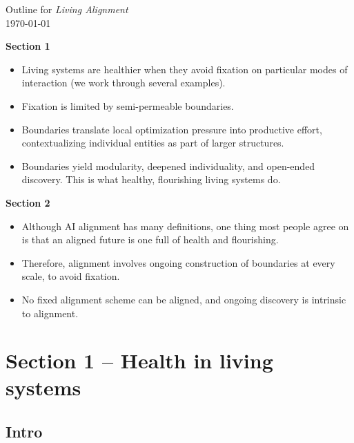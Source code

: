 \documentclass[11pt]{article}
\newcommand{\titleblock}{%
  \begin{center}
    {\LARGE Outline for \textit{Living Alignment}}\\[0.4em]
    {\normalsize\today}
  \end{center}
}
\begin{document}
\vspace{-2.5em}
\titleblock
\vspace{-1em}

\medskip
\begin{previewbox}
\noindent\textbf{Section 1}
\begin{itemize}[leftmargin=2.0em, itemsep=0.3ex]
  \item Living systems are healthier when they avoid fixation on particular modes of interaction (we work through several examples).
  \item Fixation is limited by semi-permeable boundaries.
  \item Boundaries translate local optimization pressure into productive effort, contextualizing individual entities as part of larger structures.
  \item Boundaries yield modularity, deepened individuality, and open-ended discovery. This is what healthy, flourishing living systems do.
\end{itemize} \textbf{Section 2}
\begin{itemize}[leftmargin=2.0em, itemsep=0.3ex]
  \item Although AI alignment has many definitions, one thing most people agree on is that an aligned future is one full of health and flourishing.
  \item Therefore, alignment involves ongoing construction of boundaries at every scale, to avoid fixation.
  \item No fixed alignment scheme can be aligned, and ongoing discovery is intrinsic to alignment.
\end{itemize}
\end{previewbox}

\section*{Section 1 -- Health in living systems}

\subsection*{Intro}
\end{document}

